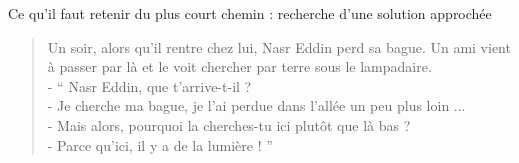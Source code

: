 \begin{frame}{Ce qu'il faut retenir du plus court chemin : recherche d'une solution approchée}
  \bigskip 

  \begin{verse}
    Un soir, alors qu'il rentre chez lui, Nasr Eddin perd sa bague. Un ami vient à passer par là et le voit chercher par terre sous le lampadaire. \\
    - `` Nasr Eddin, que t'arrive-t-il ?\\
    - Je cherche ma bague, je l'ai perdue dans l'allée un peu plus loin ...\\
    - Mais alors, pourquoi la cherches-tu ici plutôt que là bas ?\\
    - Parce qu'ici, il y a de la lumière ! ''
  \end{verse}



\end{frame}
